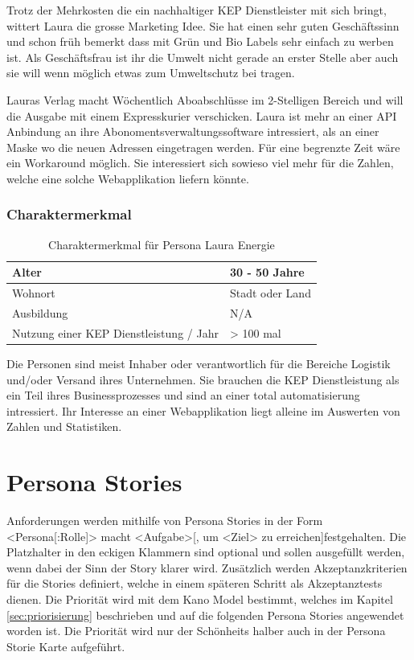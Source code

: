 Trotz der Mehrkosten die ein nachhaltiger KEP Dienstleister mit sich bringt, wittert Laura die grosse Marketing Idee. Sie hat einen sehr guten Geschäftssinn und schon früh bemerkt dass mit Grün und Bio Labels sehr einfach zu werben ist. Als Geschäftsfrau ist ihr die Umwelt nicht gerade an erster Stelle aber auch sie will wenn möglich etwas zum Umweltschutz bei tragen.


Lauras Verlag macht Wöchentlich Aboabschlüsse im 2-Stelligen Bereich und will die Ausgabe mit einem Expresskurier verschicken. Laura ist mehr an einer API Anbindung an ihre Abonomentsverwaltungssoftware intressiert, als an einer Maske wo die neuen Adressen eingetragen werden. Für eine begrenzte Zeit wäre ein Workaround möglich. Sie interessiert sich sowieso viel mehr für die Zahlen, welche eine solche Webapplikation liefern könnte.

\subsubsection{Charaktermerkmal}
\begin{table}[]
\centering

\label{my-label}
\begin{tabular}{|l|l|}
\hline
Alter                                   & 30 - 50 Jahre        \\ \hline
Wohnort                                 & Stadt oder Land         \\ \hline
Ausbildung                              & N/A  \\ \hline
Nutzung einer KEP Dienstleistung / Jahr & > 100 mal            \\ \hline
\end{tabular}
\caption{Charaktermerkmal für Persona Laura Energie}
\end{table}

Die Personen sind meist Inhaber oder verantwortlich für die Bereiche Logistik und/oder Versand ihres Unternehmen. Sie brauchen die KEP Dienstleistung als ein Teil ihres Businessprozesses und sind an einer total automatisierung intressiert. Ihr Interesse an einer Webapplikation liegt alleine im Auswerten von Zahlen und Statistiken.



\section{Persona Stories}
\label{sec:personastories}

 Anforderungen werden mithilfe von Persona Stories in der Form \glqq <Persona[:Rolle]> macht <Aufgabe>[, um <Ziel> zu erreichen]\grqq festgehalten. Die Platzhalter in den eckigen Klammern sind optional und sollen ausgefüllt werden, wenn dabei der Sinn der Story klarer wird. Zusätzlich werden Akzeptanzkriterien für die Stories definiert, welche in einem späteren Schritt als Akzeptanztests dienen. Die Priorität wird mit dem Kano Model bestimmt, welches im Kapitel \ref{sec:priorisierung} beschrieben und auf die folgenden Persona Stories angewendet worden ist. Die Priorität wird nur der Schönheits halber auch in der Persona Storie Karte aufgeführt.


